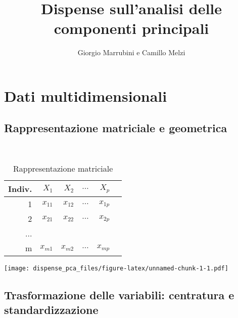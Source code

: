 \documentclass[
  11pt,
]{book}
\title{Dispense sull'analisi delle componenti principali}
\author{Giorgio Marrubini e Camillo Melzi}
\date{}
\begin{document}
\maketitle

{
\hypersetup{linkcolor=}
\setcounter{tocdepth}{1}
\tableofcontents
}
\hypertarget{section}{%
\chapter*{}\label{section}}

\hypertarget{dati-multidimensionali}{%
\chapter{Dati multidimensionali}\label{dati-multidimensionali}}

\hypertarget{rappresentazione-matriciale-e-geometrica}{%
\section{Rappresentazione matriciale e geometrica}\label{rappresentazione-matriciale-e-geometrica}}

\begin{table}[h]
\caption{Rappresentazione matriciale}
\label{tab:RegrMult}
\ 
\begin{center}
\begin{tabular}{rrrrrr}
\hline
Indiv. & $X_1$ & $X_2$ & $\dots$ & $X_p$ \\
\hline
1 & $x_{11}$ & $x_{12}$ & $\dots$ & $x_{1p}$\\
2 & $x_{21}$ & $x_{22}$ & $\dots$ & $x_{2p}$ \\
...\\
m & $x_{m1}$ & $x_{m2}$ & $\dots$ & $x_{mp}$ \\
\hline
\end{tabular}
\end{center}
\end{table}

\texttt{[image: dispense\_pca\_files/figure-latex/unnamed-chunk-1-1.pdf]}

\hypertarget{trasformazione-delle-variabili-centratura-e-standardizzazione}{%
\section{Trasformazione delle variabili: centratura e standardizzazione}\label{trasformazione-delle-variabili-centratura-e-standardizzazione}}
\end{document}

